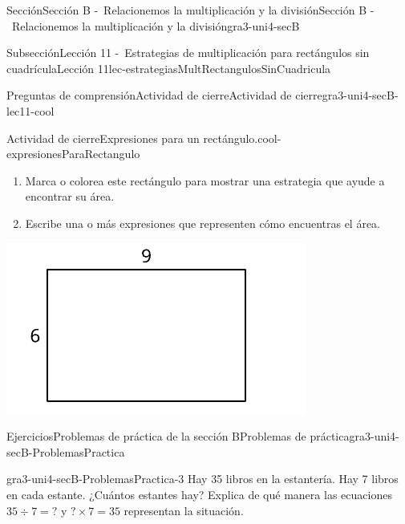 \documentclass[twoside,10pt,]{article}
\begin{document}
\begin{sectionptx}{Sección}{Sección B -~Relacionemos la multiplicación y la división}{}{Sección B -~Relacionemos la multiplicación y la división}{}{}{gra3-uni4-secB}
\begin{subsectionptx}{Subsección}{Lección 11 -~Estrategias de multiplicación para rectángulos sin cuadrícula}{}{Lección 11}{}{}{lec-estrategiasMultRectangulosSinCuadricula}
\begin{reading-questions-subsubsection}{Preguntas de comprensión}{Actividad de cierre}{}{Actividad de cierre}{}{}{gra3-uni4-secB-lec11-cool}
\begin{project}{Actividad de cierre}{Expresiones para un rectángulo.}{cool-expresionesParaRectangulo}%
\begin{sidebyside}{2}{0}{0}{0}%
\begin{sbspanel}{0.6}%
%
\begin{enumerate}[label={(\alph*)}]
\item{}Marca o colorea este rectángulo para mostrar una estrategia que ayude a encontrar su área.%
\item{}Escribe una o más expresiones que representen cómo encuentras el área.%
\end{enumerate}
\end{sbspanel}%
\begin{sbspanel}{0.4}%
\includegraphics[width=\linewidth]{external/svg-source/tikz-file-158678-scale13.pdf}
\end{sbspanel}%
\end{sidebyside}%
\end{project}%
\end{reading-questions-subsubsection}
\end{subsectionptx}
%
%
\typeout{************************************************}
\typeout{************************************************}
%
\begin{exercises-subsection}{Ejercicios}{Problemas de práctica de la sección B}{}{Problemas de práctica}{}{}{gra3-uni4-secB-ProblemasPractica}
\begin{divisionexercise}{1}{}{}{gra3-uni4-secB-ProblemasPractica-3}%
Hay 35 libros en la estantería. Hay 7 libros en cada estante. ¿Cuántos estantes hay? Explica de qué manera las ecuaciones \(35 \div 7 = {?}\) y \({?} \times 7 = 35\) representan la situación.%
\end{divisionexercise}%

\end{exercises-subsection}
\end{sectionptx}
\end{document}
